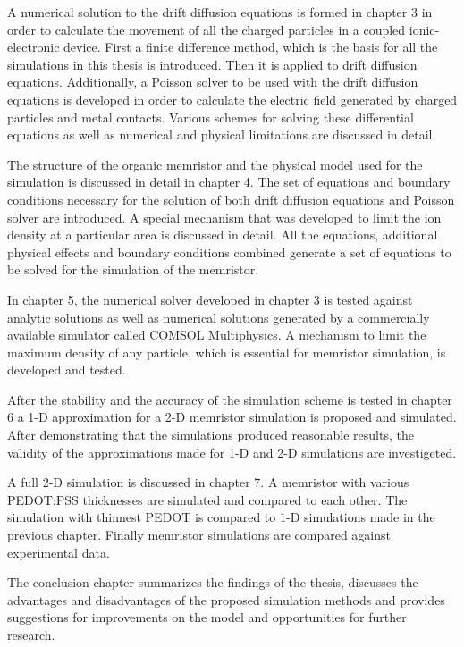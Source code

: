 \begin{doublespace}
A numerical solution to the drift diffusion equations is formed in chapter 3 in order to calculate the movement of all the charged particles in a coupled ionic-electronic device. First a finite difference method, which is the basis for all the simulations in this thesis is introduced. Then it is applied to drift diffusion equations. Additionally, a Poisson solver to be used with the drift diffusion equations is developed in order to calculate the electric field generated by charged particles and metal contacts. Various schemes for solving these differential equations as well as numerical and physical limitations are discussed in detail.

The structure of the organic memristor and the physical model used for the simulation is discussed in detail in chapter 4. The set of equations and boundary conditions necessary for the solution of both drift diffusion equations and Poisson solver are introduced. A special mechanism that was developed to limit the ion density at a particular area is discussed in detail. All the equations, additional physical effects and boundary conditions combined generate a set of equations to be solved for the simulation of the memristor.
 
In chapter 5, the numerical solver developed in chapter 3 is tested against analytic solutions as well as numerical solutions generated by a commercially available simulator called COMSOL Multiphysics. A mechanism to limit the maximum density of any particle, which is essential for memristor simulation, is developed and tested. 

After the stability and the accuracy of the simulation scheme is tested in chapter 6 a 1-D approximation for a 2-D memristor simulation is proposed and simulated. After demonstrating that the simulations produced reasonable results, the validity of the approximations made for 1-D and 2-D simulations are investigeted.  

A full 2-D simulation is discussed in chapter 7. A memristor with various PEDOT:PSS thicknesses are simulated and compared to each other. The simulation with thinnest PEDOT is compared to 1-D simulations made in the previous chapter. Finally memristor simulations are compared against experimental data.

The conclusion chapter summarizes the findings of the thesis, discusses the advantages and disadvantages of the proposed simulation methods and provides suggestions for improvements on the model and opportunities for further research.


\end{doublespace}
